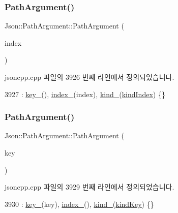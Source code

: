 \subsubsection{\texorpdfstring{Path\+Argument()}{PathArgument()}\hspace{0.1cm}{\footnotesize\ttfamily [2/4]}}
{\footnotesize\ttfamily Json\+::\+Path\+Argument\+::\+Path\+Argument (\begin{DoxyParamCaption}\item[{\hyperlink{namespace_json_a8048e741f2177c3b5d9ede4a5b8c53c2}{Array\+Index}}]{index }\end{DoxyParamCaption})}



jsoncpp.\+cpp 파일의 3926 번째 라인에서 정의되었습니다.


\begin{DoxyCode}
3927     : \hyperlink{class_json_1_1_path_argument_af4024368548ff730ef2bed97d6f1ca43}{key\_}(), \hyperlink{class_json_1_1_path_argument_afd5857d1b6bfaae6961333bdae7bd5ec}{index\_}(index), \hyperlink{class_json_1_1_path_argument_ad4bc4b544b155a3d9c7788572ecf991b}{kind\_}(\hyperlink{class_json_1_1_path_argument_a2420bbad778573c147e578701b84d9b9ae5a976b898111903334cb131f5e03dc4}{kindIndex}) \{\}
\end{DoxyCode}
\mbox{\label{class_json_1_1_path_argument_a9690417a8a40e6e49f2acdf6c9281345}} 
\subsubsection{\texorpdfstring{Path\+Argument()}{PathArgument()}\hspace{0.1cm}{\footnotesize\ttfamily [3/4]}}
{\footnotesize\ttfamily Json\+::\+Path\+Argument\+::\+Path\+Argument (\begin{DoxyParamCaption}\item[{const char $\ast$}]{key }\end{DoxyParamCaption})}



jsoncpp.\+cpp 파일의 3929 번째 라인에서 정의되었습니다.


\begin{DoxyCode}
3930     : \hyperlink{class_json_1_1_path_argument_af4024368548ff730ef2bed97d6f1ca43}{key\_}(key), \hyperlink{class_json_1_1_path_argument_afd5857d1b6bfaae6961333bdae7bd5ec}{index\_}(), \hyperlink{class_json_1_1_path_argument_ad4bc4b544b155a3d9c7788572ecf991b}{kind\_}(\hyperlink{class_json_1_1_path_argument_a2420bbad778573c147e578701b84d9b9a74f5968d06c01701b7a46092c33ba7d1}{kindKey}) \{\}
\end{DoxyCode}
\mbox{\label{class_json_1_1_path_argument_ac15f25452124fbf21218897113015301}} 
